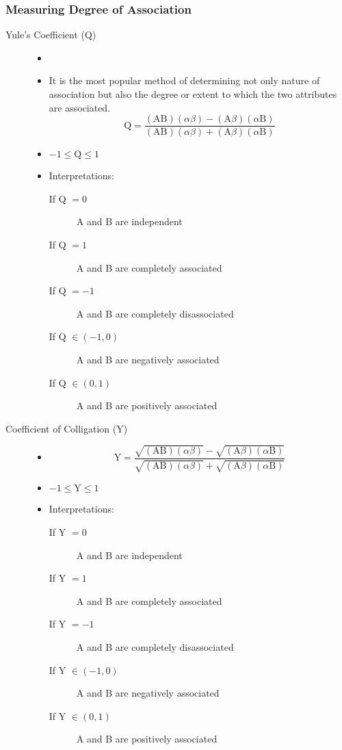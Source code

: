 \documentclass[
10pt, %
a4paper, %
]{report}
\begin{document}
\subsubsection*{Measuring Degree of Association}
\begin{description}
\item[Yule's Coefficient (Q)]
\begin{itemize}
\item[]
\item It is the most popular method of determining not only nature of association but also the degree or extent to which the two attributes are associated.
\[
\text{Q} = \frac{(\text{AB})(\alpha\beta) - (\text{A}\beta)(\alpha \text{B})}{(\text{AB})(\alpha\beta) + (\text{A}\beta)(\alpha \text{B})}
\]
\item \(-1 \le \text{Q} \le 1\)
\item Interpretations:
\begin{description}
\item[If Q \(=0\)] \item[] A and B are independent
\item[If Q \(=1\)] \item[] A and B are completely associated
\item[If Q \(=-1\)] \item[] A and B are completely disassociated
\item[If Q \(\in (-1, 0)\)] \item[] A and B are negatively associated
\item[If Q \(\in (0, 1)\)] \item[] A and B are positively associated
\end{description}
\end{itemize}
\item[Coefficient of Colligation (Y)]
\begin{itemize}
\item[]
\[
\text{Y} = \frac{\sqrt{(\text{AB})(\alpha\beta)} - \sqrt{(\text{A}\beta)(\alpha \text{B})}}{\sqrt{(\text{AB})(\alpha\beta)} + \sqrt{(\text{A}\beta)(\alpha \text{B})}}
\]
\item \(-1 \le \text{Y} \le 1\)
\item Interpretations:
\begin{description}
\item[If Y \(=0\)] \item[] A and B are independent
\item[If Y \(=1\)] \item[] A and B are completely associated
\item[If Y \(=-1\)] \item[] A and B are completely disassociated
\item[If Y \(\in (-1, 0)\)] \item[] A and B are negatively associated
\item[If Y \(\in (0, 1)\)] \item[] A and B are positively associated
\end{description}
\end{itemize}
\end{description}
\end{document}
